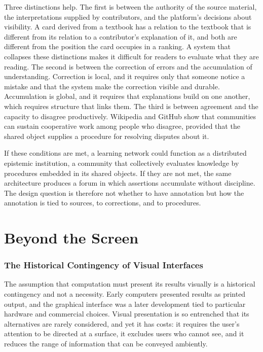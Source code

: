 \documentclass[11pt]{article}
\theoremstyle{remark}
\begin{document}
Three distinctions help. The first is between the authority of the source material, the interpretations supplied by contributors, and the platform's decisions about visibility. A card derived from a textbook has a relation to the textbook that is different from its relation to a contributor's explanation of it, and both are different from the position the card occupies in a ranking. A system that collapses these distinctions makes it difficult for readers to evaluate what they are reading. The second is between the correction of errors and the accumulation of understanding. Correction is local, and it requires only that someone notice a mistake and that the system make the correction visible and durable. Accumulation is global, and it requires that explanations build on one another, which requires structure that links them. The third is between agreement and the capacity to disagree productively. Wikipedia and GitHub show that communities can sustain cooperative work among people who disagree, provided that the shared object supplies a procedure for resolving disputes about it.

If these conditions are met, a learning network could function as a distributed epistemic institution, a community that collectively evaluates knowledge by procedures embedded in its shared objects. If they are not met, the same architecture produces a forum in which assertions accumulate without discipline. The design question is therefore not whether to have annotation but how the annotation is tied to sources, to corrections, and to procedures.

\part{Beyond the Screen}

\section{The Historical Contingency of Visual Interfaces}

The assumption that computation must present its results visually is a historical contingency and not a necessity. Early computers presented results as printed output, and the graphical interface was a later development tied to particular hardware and commercial choices. Visual presentation is so entrenched that its alternatives are rarely considered, and yet it has costs: it requires the user's attention to be directed at a surface, it excludes users who cannot see, and it reduces the range of information that can be conveyed ambiently.
\end{document}
